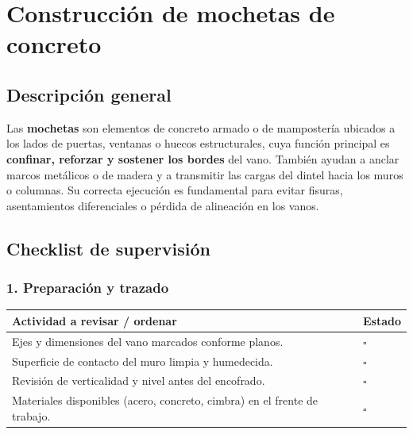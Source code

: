 \documentclass[12pt]{article}
\newcommand{\cbox}{\(\square\)} %
\begin{document}
	
	
		
	
	
		
	\section{Construcción de mochetas de concreto}
	
	\subsection*{Descripción general}
	Las \textbf{mochetas} son elementos de concreto armado o de mampostería ubicados a los lados de puertas, ventanas o huecos estructurales, cuya función principal es \textbf{confinar, reforzar y sostener los bordes} del vano. También ayudan a anclar marcos metálicos o de madera y a transmitir las cargas del dintel hacia los muros o columnas. Su correcta ejecución es fundamental para evitar fisuras, asentamientos diferenciales o pérdida de alineación en los vanos.
	

	
	\subsection{Checklist de supervisión}
	
	\subsubsection*{1. Preparación y trazado}
	\begin{tabularx}{\linewidth}{>{\raggedright\arraybackslash}p{0.93\linewidth} >{\centering\arraybackslash}m{0.07\linewidth}}
		\toprule
		\textbf{Actividad a revisar / ordenar} & \textbf{Estado}\\
		\midrule
		Ejes y dimensiones del vano marcados conforme planos. & \cbox \\
		Superficie de contacto del muro limpia y humedecida. & \cbox \\
		Revisión de verticalidad y nivel antes del encofrado. & \cbox \\
		Materiales disponibles (acero, concreto, cimbra) en el frente de trabajo. & \cbox \\
		\bottomrule
	\end{tabularx}
	
\end{document}
